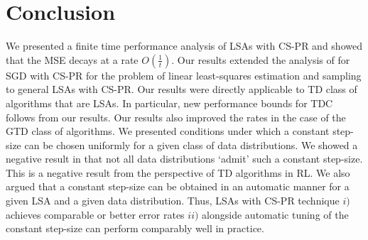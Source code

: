 \section{Conclusion}
We presented a finite time performance analysis of LSAs with CS-PR and showed that the MSE decays at a rate $O(\frac{1}{t})$. Our results extended the analysis of \citet{bach} for SGD with CS-PR for the problem of linear least-squares estimation and \iid sampling to general LSAs with CS-PR. Our results were directly applicable to TD class of algorithms that are LSAs. In particular, new performance bounds for TDC follows from our results. Our results also improved the rates in the case of the GTD class of algorithms. We presented conditions under which a constant step-size can be chosen uniformly for a given class of data distributions. We showed a negative result in that not all data distributions `admit' such a constant step-size. This is a negative result from the perspective of TD algorithms in RL. We also argued that a constant step-size can be obtained in an automatic manner for a given LSA and a given data distribution. Thus, LSAs with CS-PR technique $i)$ achieves comparable or better error rates $ii)$ alongside automatic tuning of the constant step-size can perform comparably well in practice.
